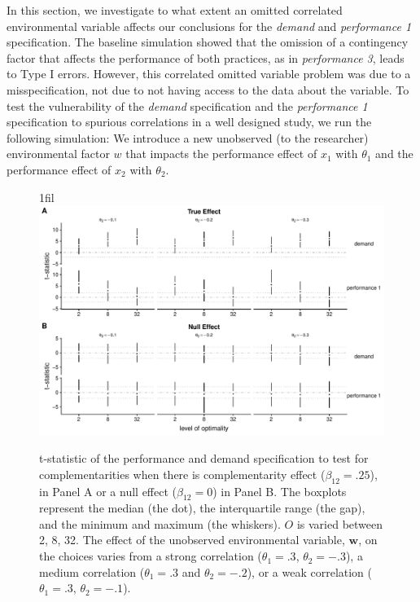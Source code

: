 \documentclass[12pt]{article}
\makeatletter
\newcommand*{\centerfloat}{%
  \parindent \z@
  \leftskip \z@ \@plus 1fil \@minus \textwidth
  \rightskip\leftskip
  \parfillskip \z@skip}
\makeatother
\begin{document}
In this section, we investigate to what extent an omitted correlated environmental variable affects our conclusions for the \emph{demand} and \emph{performance 1} specification. The baseline simulation showed that the omission of a contingency factor that affects the performance of both practices, as in \emph{performance 3}, leads to Type I errors. However, this correlated omitted variable problem was due to a misspecification, not due to not having access to the data about the variable. To test the vulnerability of the \emph{demand} specification and the \emph{performance 1} specification to spurious correlations in a well designed study, we run the following simulation: We introduce a new unobserved (to the researcher) environmental factor \(w\) that impacts the performance effect of \(x_1\) with \(\theta_1\) and the performance effect of \(x_2\) with \(\theta_2\). 

\begin{figure}
\centerfloat
\includegraphics[width=450px]{figure-latex/spurious_new_plot.pdf}
\caption[Error Rate and Power with Unobserved Environmental Variables]
{\label{spurious} t-statistic of the performance and demand specification to test
for complementarities when there is complementarity effect ($\beta_{12} = .25$),
in Panel A or a null effect ($\beta_{12} = 0$) in Panel B. The boxplots represent the median (the dot), the interquartile range (the gap), and the minimum and maximum (the whiskers). $O$ is varied between 2, 8, 32. The effect of the unobserved environmental variable, $\mathbf{w}$, on the choices varies from a strong correlation ($\theta_1 = .3$, $\theta_2 = -.3$), a medium correlation ($\theta_1 = .3$ and $\theta_2 = -.2$), or a weak correlation ($\theta_1 =.3$, $\theta_2 = -.1$).}
\end{figure}
\end{document}
